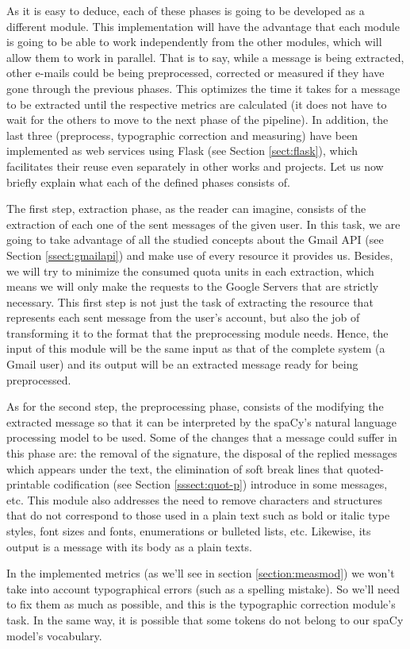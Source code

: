 As it is easy to deduce, each of these phases is going to be developed as a different module. This implementation will have the advantage that each module is going to be able to work independently from the other modules, which will allow them to work in parallel. That is to say, while a message is being extracted, other e-mails could be being preprocessed, corrected or measured if they have gone through the previous phases. This optimizes the time it takes for a message to be extracted until the respective metrics are calculated (it does not have to wait for the others to move to the next phase of the pipeline). In addition, the last three (preprocess, typographic correction and measuring) have been implemented as web services using Flask (see Section \ref{sect:flask}), which facilitates their reuse even separately in other works and projects. Let us now briefly explain what each of the defined phases consists of.

The first step, extraction phase, as the reader can imagine, consists of the extraction of each one of the sent messages of the given user. In this task, we are going to take advantage of all the studied concepts about the Gmail API (see Section \ref{ssect:gmailapi}) and make use of every resource it provides us. Besides, we will try to minimize the consumed quota units in each extraction, which means we will only make the requests to the Google Servers that are strictly necessary. This first step is not just the task of extracting the resource that represents each sent message from the user's account, but also the job of transforming it to the format that the preprocessing module needs. Hence, the input of this module will be the same input as that of the complete system (a Gmail user) and its output will be an extracted message ready for being preprocessed.

As for the second step, the preprocessing phase, consists of the modifying the extracted message so that it can be interpreted by the spaCy's natural language processing model to be used. Some of the changes that a message could suffer in this phase are: the removal of the signature, the disposal of the replied messages which appears under the text, the elimination of soft break lines that quoted-printable codification (see Section \ref{sssect:quot-p}) introduce in some messages, etc. This module also addresses the need to remove characters and structures that do not correspond to those used in a plain text such as bold or italic type styles, font sizes and fonts, enumerations or bulleted lists, etc. Likewise, its output is a message with its body as a plain texts.

In the implemented metrics (as we'll see in section \ref{section:measmod}) we won't take into account typographical errors (such as a spelling mistake). So we'll need to fix them as much as possible, and this is the typographic correction module's task. In the same way, it is possible that some tokens do not belong to our spaCy model's vocabulary.